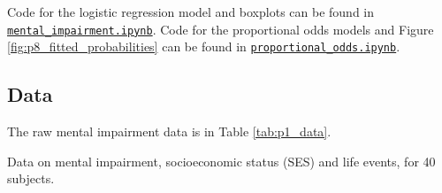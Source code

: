 \documentclass[letterpaper,11pt]{article}
\begin{document}
Code for the logistic regression model and boxplots can be found in
\href{http://nbviewer.jupyter.org/github/ppham27/stat570/blob/master/hw7/mental_impairment.ipynb}{\texttt{mental\_impairment.ipynb}}. Code
for the proportional odds models and Figure \ref{fig:p8_fitted_probabilities}
can be found in
\href{http://nbviewer.jupyter.org/github/ppham27/stat570/blob/master/hw7/proportional\_odds.ipynb}{\texttt{proportional\_odds.ipynb}}.

\subsection*{Data}

The raw mental impairment data is in Table \ref{tab:p1_data}.

\begin{table}[h]
  \scriptsize
  \centering
  
  \caption{Data on mental impairment, socioeconomic status (SES) and life
    events, for 40 subjects.}
  \label{tab:p1_data}
\end{table}
\end{document}
